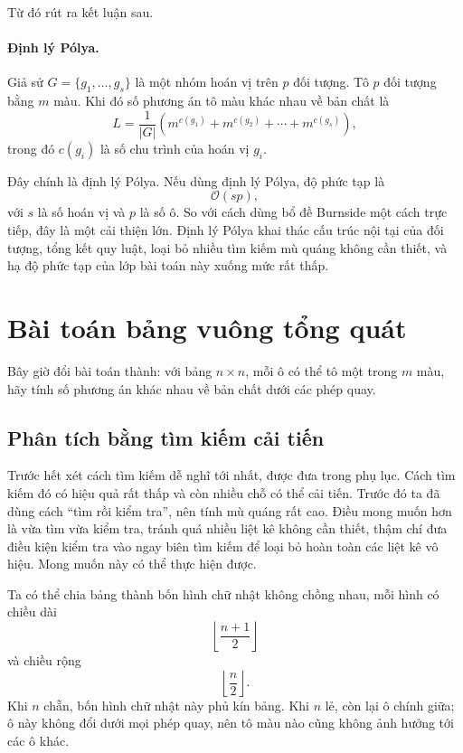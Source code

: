 \documentclass[11pt]{article}
\begin{document}
Từ đó rút ra kết luận sau.

\paragraph{Định lý Pólya.}
Giả sử \(G=\{g_1,\ldots,g_s\}\) là một nhóm hoán vị trên \(p\) đối tượng. Tô
\(p\) đối tượng bằng \(m\) màu. Khi đó số phương án tô màu khác nhau về bản
chất là
\[
  L=\frac{1}{|G|}
    \left(m^{c(g_1)}+m^{c(g_2)}+\cdots+m^{c(g_s)}\right),
\]
trong đó \(c(g_i)\) là số chu trình của hoán vị \(g_i\).

Đây chính là định lý Pólya. Nếu dùng định lý Pólya, độ phức tạp là
\[
  \mathcal{O}(sp),
\]
với \(s\) là số hoán vị và \(p\) là số ô. So với cách dùng bổ đề Burnside một
cách trực tiếp, đây là một cải thiện lớn. Định lý Pólya khai thác cấu trúc
nội tại của đối tượng, tổng kết quy luật, loại bỏ nhiều tìm kiếm mù quáng
không cần thiết, và hạ độ phức tạp của lớp bài toán này xuống mức rất thấp.

\section{Bài toán bảng vuông tổng quát}

Bây giờ đổi bài toán thành: với bảng \(n\times n\), mỗi ô có thể tô một trong
\(m\) màu, hãy tính số phương án khác nhau về bản chất dưới các phép quay.

\subsection{Phân tích bằng tìm kiếm cải tiến}

Trước hết xét cách tìm kiếm dễ nghĩ tới nhất, được đưa trong phụ lục. Cách
tìm kiếm đó có hiệu quả rất thấp và còn nhiều chỗ có thể cải tiến. Trước đó
ta đã dùng cách ``tìm rồi kiểm tra'', nên tính mù quáng rất cao. Điều mong
muốn hơn là vừa tìm vừa kiểm tra, tránh quá nhiều liệt kê không cần thiết,
thậm chí đưa điều kiện kiểm tra vào ngay biên tìm kiếm để loại bỏ hoàn toàn
các liệt kê vô hiệu. Mong muốn này có thể thực hiện được.

Ta có thể chia bảng thành bốn hình chữ nhật không chồng nhau, mỗi hình có
chiều dài
\[
  \left\lfloor\frac{n+1}{2}\right\rfloor
\]
và chiều rộng
\[
  \left\lfloor\frac{n}{2}\right\rfloor.
\]
Khi \(n\) chẵn, bốn hình chữ nhật này phủ kín bảng. Khi \(n\) lẻ, còn lại ô
chính giữa; ô này không đổi dưới mọi phép quay, nên tô màu nào cũng không ảnh
hưởng tới các ô khác.
\end{document}
